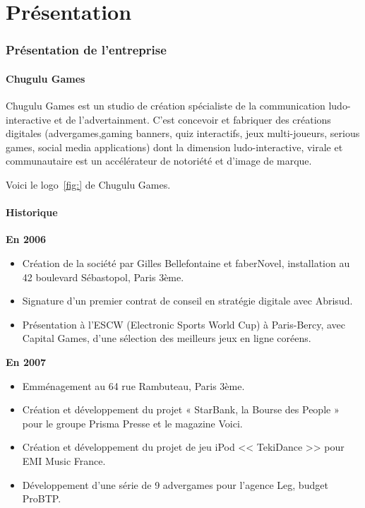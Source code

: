 \chapter{Présentation} %

\subsection{Présentation de l'entreprise} %

\subsubsection{Chugulu Games} %

Chugulu Games est un studio de création spécialiste de la communication ludo-interactive et de l'advertainment. C'est concevoir et fabriquer des créations digitales (advergames,gaming banners, quiz interactifs, jeux multi-joueurs, serious games, social media applications) dont la dimension ludo-interactive, virale et communautaire est un accélérateur de notoriété et d'image de marque.

Voici le logo~\ref{fig:} de Chugulu Games.



\subsubsection{Historique} %



\textbf{En 2006}

\begin{itemize}
	\item Création de la société par Gilles Bellefontaine et faberNovel, installation au 42 boulevard Sébastopol, Paris 3ème.
	\item Signature d’un premier contrat de conseil en stratégie digitale avec Abrisud.
	\item Présentation à l’ESCW (Electronic Sports World Cup) à Paris-Bercy, avec Capital Games, d’une sélection des meilleurs jeux en ligne coréens.
 \end{itemize}


\textbf{En 2007}

\begin{itemize}
	\item Emménagement au 64 rue Rambuteau, Paris 3ème.
	\item Création et développement du projet « StarBank, la Bourse des People » pour le groupe Prisma Presse et le magazine Voici.
	\item Création et développement du projet de jeu iPod << TekiDance >> pour EMI Music France.
	\item Développement d’une série de 9 advergames pour l’agence Leg, budget ProBTP.
\end{itemize}

